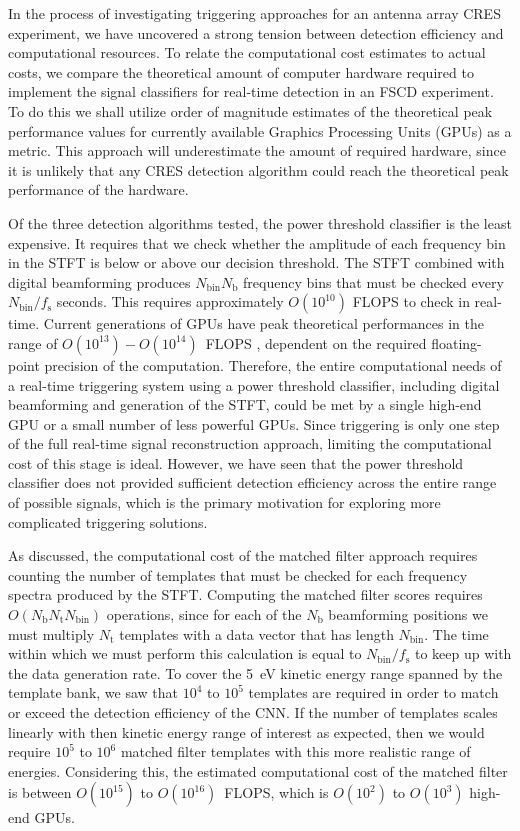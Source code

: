 In the process of investigating triggering approaches for an antenna array CRES experiment, we have uncovered a strong tension between detection efficiency and computational resources. To relate the computational cost estimates to actual costs, we compare the theoretical amount of computer hardware required to implement the signal classifiers for real-time detection in an FSCD experiment. To do this we shall utilize order of magnitude estimates of the theoretical peak performance values for currently available Graphics Processing Units (GPUs) as a metric. This approach will underestimate the amount of required hardware, since it is unlikely that any CRES detection algorithm could reach the theoretical peak performance of the hardware. 

Of the three detection algorithms tested, the power threshold classifier is the least expensive. It requires that we check whether the amplitude of each frequency bin in the STFT is below or above our decision threshold. The STFT combined with digital beamforming produces $N_\mathrm{bin}N_\mathrm{b}$ frequency bins that must be checked every $N_\mathrm{bin}/f_\mathrm{s}$ seconds. This requires approximately $O(10^{10})$ FLOPS to check in real-time. Current generations of GPUs have peak theoretical performances in the range of $O(10^{13})-O(10^{14})$~FLOPS \cite{h100}, dependent on the required floating-point precision of the computation. Therefore, the entire computational needs of a real-time triggering system using a power threshold classifier, including digital beamforming and generation of the STFT, could be met by a single high-end GPU or a small number of less powerful GPUs. Since triggering is only one step of the full real-time signal reconstruction approach, limiting the computational cost of this stage is ideal. However, we have seen that the power threshold classifier does not provided sufficient detection efficiency across the entire range of possible signals, which is the primary motivation for exploring more complicated triggering solutions. 

As discussed, the computational cost of the matched filter approach requires counting the number of templates that must be checked for each frequency spectra produced by the STFT. Computing the matched filter scores requires $O(N_\mathrm{b}N_\mathrm{t}N_\mathrm{bin})$ operations, since for each of the $N_\mathrm{b}$ beamforming positions we must multiply $N_\mathrm{t}$ templates with a data vector that has length $N_\mathrm{bin}$. The time within which we must perform this calculation is equal to $N_\mathrm{bin}/f_\mathrm{s}$ to keep up with the data generation rate. To cover the 5~eV kinetic energy range spanned by the template bank, we saw that $10^4$ to $10^5$ templates are required in order to match or exceed the detection efficiency of the CNN. If the number of templates scales linearly with then kinetic energy range of interest as expected, then we would require $10^5$ to $10^6$ matched filter templates with this more realistic range of energies. Considering this, the estimated computational cost of the matched filter is between $O(10^{15})$ to $O(10^{16})$~FLOPS, which is $O(10^2)$ to $O(10^3)$ high-end GPUs.

